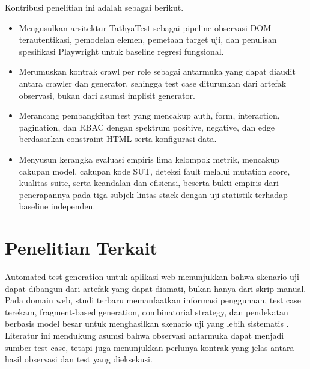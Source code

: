 \documentclass[conference]{IEEEtran}
\begin{document}
Kontribusi penelitian ini adalah sebagai berikut.

\begin{itemize}
    \item Mengusulkan arsitektur TathyaTest sebagai pipeline observasi DOM terautentikasi, pemodelan elemen, pemetaan target uji, dan penulisan spesifikasi Playwright untuk baseline regresi fungsional.
    \item Merumuskan kontrak crawl per role sebagai antarmuka yang dapat diaudit antara crawler dan generator, sehingga test case diturunkan dari artefak observasi, bukan dari asumsi implisit generator.
    \item Merancang pembangkitan test yang mencakup auth, form, interaction, pagination, dan RBAC dengan spektrum positive, negative, dan edge berdasarkan constraint HTML serta konfigurasi data.
    \item Menyusun kerangka evaluasi empiris lima kelompok metrik, mencakup cakupan model, cakupan kode SUT, deteksi fault melalui mutation score, kualitas suite, serta keandalan dan efisiensi, beserta bukti empiris dari penerapannya pada tiga subjek lintas-stack dengan uji statistik terhadap baseline independen.
\end{itemize}

\section{Penelitian Terkait}

Automated test generation untuk aplikasi web menunjukkan bahwa skenario uji dapat dibangun dari artefak yang dapat diamati, bukan hanya dari skrip manual. Pada domain web, studi terbaru memanfaatkan informasi penggunaan, test case terekam, fragment-based generation, combinatorial strategy, dan pendekatan berbasis model besar untuk menghasilkan skenario uji yang lebih sistematis \cite{garcia2021webusage,sunman2022automated,yandrapally2023fragment,letraon2023combinatorial,alian2024autoe2e}. Literatur ini mendukung asumsi bahwa observasi antarmuka dapat menjadi sumber test case, tetapi juga menunjukkan perlunya kontrak yang jelas antara hasil observasi dan test yang dieksekusi.
\end{document}
